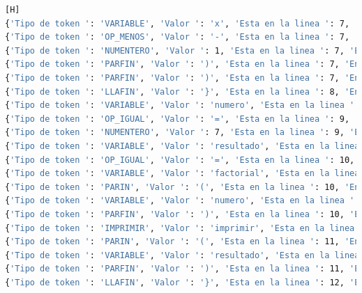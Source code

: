 \documentclass{article}
\begin{document}
\begin{lstlisting}[language=bash,caption={Tokens de Factorial}][H]
{'Tipo de token ': 'VARIABLE', 'Valor ': 'x', 'Esta en la linea ': 7, 'En la posición ': 121}
{'Tipo de token ': 'OP_MENOS', 'Valor ': '-', 'Esta en la linea ': 7, 'En la posición ': 122}
{'Tipo de token ': 'NUMENTERO', 'Valor ': 1, 'Esta en la linea ': 7, 'En la posición ': 123}
{'Tipo de token ': 'PARFIN', 'Valor ': ')', 'Esta en la linea ': 7, 'En la posición ': 124}
{'Tipo de token ': 'PARFIN', 'Valor ': ')', 'Esta en la linea ': 7, 'En la posición ': 125}
{'Tipo de token ': 'LLAFIN', 'Valor ': '}', 'Esta en la linea ': 8, 'En la posición ': 131}
{'Tipo de token ': 'VARIABLE', 'Valor ': 'numero', 'Esta en la linea ': 9, 'En la posición ': 133}
{'Tipo de token ': 'OP_IGUAL', 'Valor ': '=', 'Esta en la linea ': 9, 'En la posición ': 140}
{'Tipo de token ': 'NUMENTERO', 'Valor ': 7, 'Esta en la linea ': 9, 'En la posición ': 142}
{'Tipo de token ': 'VARIABLE', 'Valor ': 'resultado', 'Esta en la linea ': 10, 'En la posición ': 144}
{'Tipo de token ': 'OP_IGUAL', 'Valor ': '=', 'Esta en la linea ': 10, 'En la posición ': 154}
{'Tipo de token ': 'VARIABLE', 'Valor ': 'factorial', 'Esta en la linea ': 10, 'En la posición ': 156}
{'Tipo de token ': 'PARIN', 'Valor ': '(', 'Esta en la linea ': 10, 'En la posición ': 165}
{'Tipo de token ': 'VARIABLE', 'Valor ': 'numero', 'Esta en la linea ': 10, 'En la posición ': 166}
{'Tipo de token ': 'PARFIN', 'Valor ': ')', 'Esta en la linea ': 10, 'En la posición ': 172}
{'Tipo de token ': 'IMPRIMIR', 'Valor ': 'imprimir', 'Esta en la linea ': 11, 'En la posición ': 174}
{'Tipo de token ': 'PARIN', 'Valor ': '(', 'Esta en la linea ': 11, 'En la posición ': 182}
{'Tipo de token ': 'VARIABLE', 'Valor ': 'resultado', 'Esta en la linea ': 11, 'En la posición ': 183}
{'Tipo de token ': 'PARFIN', 'Valor ': ')', 'Esta en la linea ': 11, 'En la posición ': 192}
{'Tipo de token ': 'LLAFIN', 'Valor ': '}', 'Esta en la linea ': 12, 'En la posición ': 194}
\end{lstlisting}
\end{document}
